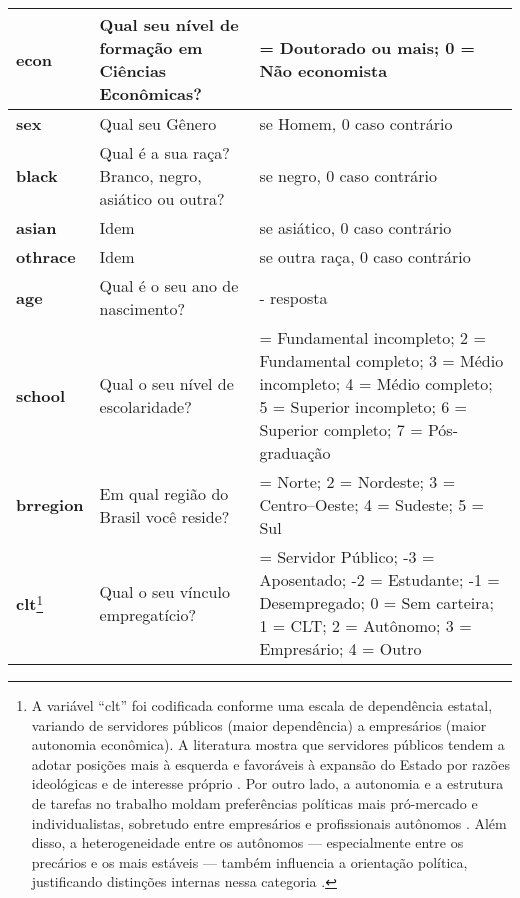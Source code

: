 \begin{apendicesenv}
\begin{longtable}{|>{\raggedright\arraybackslash}p{4cm} 
                  |>{\raggedright\arraybackslash}p{8cm} 
                  |>{\raggedright\arraybackslash}p{4cm}|}
    \hline
    \endfoot

    \hline
    \endlastfoot

    \textbf{econ} & Qual seu nível de formação em Ciências Econômicas? & 
    1 = Doutorado ou mais; 0 = Não economista \\ 
    \hline
    \textbf{sex} & Qual seu Gênero & 
    1 se Homem, 0 caso contrário \\ 
    \hline
    \textbf{black} & Qual é a sua raça? Branco, negro, asiático ou outra? & 1 se negro, 0 caso contrário \\ 
    \hline
    \textbf{asian} & Idem & 1 se asiático, 0 caso contrário \\ 
    \hline
    \textbf{othrace} & Idem & 1 se outra raça, 0 caso contrário \\   \hline
    \textbf{age} & Qual é o seu ano de nascimento? & 
    2025 - resposta \\
    \hline
    \textbf{school} & Qual o seu nível de escolaridade? & 
    1 = Fundamental incompleto; 
    2 = Fundamental completo; 
    3 = Médio incompleto; 
    4 = Médio completo; 
    5 = Superior incompleto; 
    6 = Superior completo; 
    7 = Pós-graduação \\ 
    \hline
    \textbf{brregion} & Em qual região do Brasil você reside? & 
    1 = Norte; 
    2 = Nordeste; 
    3 = Centro--Oeste; 
    4 = Sudeste; 
    5 = Sul \\ 
    \hline
    \textbf{clt}\footnote{A variável ``clt'' foi codificada conforme uma escala de dependência estatal, variando de servidores públicos (maior dependência) a empresários (maior autonomia econômica). A literatura mostra que servidores públicos tendem a adotar posições mais à esquerda e favoráveis à expansão do Estado por razões ideológicas e de interesse próprio \cite{jensen2009political}. Por outro lado, a autonomia e a estrutura de tarefas no trabalho moldam preferências políticas mais pró-mercado e individualistas, sobretudo entre empresários e profissionais autônomos \cite{kitschelt2014occupations}. Além disso, a heterogeneidade entre os autônomos — especialmente entre os precários e os mais estáveis — também influencia a orientação política, justificando distinções internas nessa categoria \cite{jansen2016self}.}  & Qual o seu vínculo empregatício? & 
    -4 = Servidor Público;  
    -3 = Aposentado;        
    -2 = Estudante;         
    -1 = Desempregado;      
    0 = Sem carteira;      
    1 = CLT;               
    2 = Autônomo;          
    3 = Empresário;        
    4 = Outro             
    \\ 

\end{longtable}
\end{apendicesenv}
